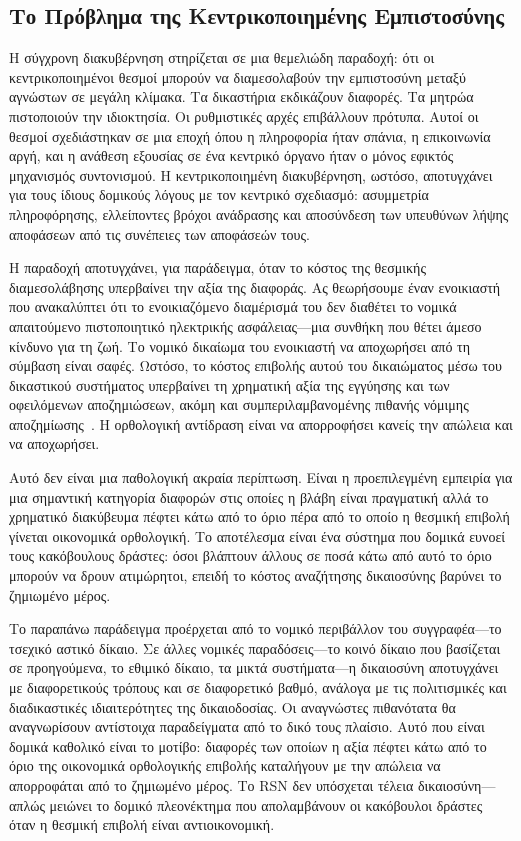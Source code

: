 \documentclass[11pt,a4paper,twocolumn]{article}
\begin{document}
\subsection{Το Πρόβλημα της Κεντρικοποιημένης Εμπιστοσύνης}

Η σύγχρονη διακυβέρνηση στηρίζεται σε μια θεμελιώδη παραδοχή: ότι οι κεντρικοποιημένοι θεσμοί μπορούν να διαμεσολαβούν την εμπιστοσύνη μεταξύ αγνώστων σε μεγάλη κλίμακα. Τα δικαστήρια εκδικάζουν διαφορές. Τα μητρώα πιστοποιούν την ιδιοκτησία. Οι ρυθμιστικές αρχές επιβάλλουν πρότυπα. Αυτοί οι θεσμοί σχεδιάστηκαν σε μια εποχή όπου η πληροφορία ήταν σπάνια, η επικοινωνία αργή, και η ανάθεση εξουσίας σε ένα κεντρικό όργανο ήταν ο μόνος εφικτός μηχανισμός συντονισμού. Η κεντρικοποιημένη διακυβέρνηση, ωστόσο, αποτυγχάνει για τους ίδιους δομικούς λόγους με τον κεντρικό σχεδιασμό: ασυμμετρία πληροφόρησης, ελλείποντες βρόχοι ανάδρασης και αποσύνδεση των υπευθύνων λήψης αποφάσεων από τις συνέπειες των αποφάσεών τους.

Η παραδοχή αποτυγχάνει, για παράδειγμα, όταν το κόστος της θεσμικής διαμεσολάβησης υπερβαίνει την αξία της διαφοράς. Ας θεωρήσουμε έναν ενοικιαστή που ανακαλύπτει ότι το ενοικιαζόμενο διαμέρισμά του δεν διαθέτει το νομικά απαιτούμενο πιστοποιητικό ηλεκτρικής ασφάλειας---μια συνθήκη που θέτει άμεσο κίνδυνο για τη ζωή. Το νομικό δικαίωμα του ενοικιαστή να αποχωρήσει από τη σύμβαση είναι σαφές. Ωστόσο, το κόστος επιβολής αυτού του δικαιώματος μέσω του δικαστικού συστήματος υπερβαίνει τη χρηματική αξία της εγγύησης και των οφειλόμενων αποζημιώσεων, ακόμη και συμπεριλαμβανομένης πιθανής νόμιμης αποζημίωσης~\cite{czcourtfees}. Η ορθολογική αντίδραση είναι να απορροφήσει κανείς την απώλεια και να αποχωρήσει.

Αυτό δεν είναι μια παθολογική ακραία περίπτωση. Είναι η προεπιλεγμένη εμπειρία για μια σημαντική κατηγορία διαφορών στις οποίες η βλάβη είναι πραγματική αλλά το χρηματικό διακύβευμα πέφτει κάτω από το όριο πέρα από το οποίο η θεσμική επιβολή γίνεται οικονομικά ορθολογική. Το αποτέλεσμα είναι ένα σύστημα που δομικά ευνοεί τους κακόβουλους δράστες: όσοι βλάπτουν άλλους σε ποσά κάτω από αυτό το όριο μπορούν να δρουν ατιμώρητοι, επειδή το κόστος αναζήτησης δικαιοσύνης βαρύνει το ζημιωμένο μέρος.

Το παραπάνω παράδειγμα προέρχεται από το νομικό περιβάλλον του συγγραφέα---το τσεχικό αστικό δίκαιο. Σε άλλες νομικές παραδόσεις---το κοινό δίκαιο που βασίζεται σε προηγούμενα, το εθιμικό δίκαιο, τα μικτά συστήματα---η δικαιοσύνη αποτυγχάνει με διαφορετικούς τρόπους και σε διαφορετικό βαθμό, ανάλογα με τις πολιτισμικές και διαδικαστικές ιδιαιτερότητες της δικαιοδοσίας. Οι αναγνώστες πιθανότατα θα αναγνωρίσουν αντίστοιχα παραδείγματα από το δικό τους πλαίσιο. Αυτό που είναι δομικά καθολικό είναι το μοτίβο: διαφορές των οποίων η αξία πέφτει κάτω από το όριο της οικονομικά ορθολογικής επιβολής καταλήγουν με την απώλεια να απορροφάται από το ζημιωμένο μέρος. Το RSN δεν υπόσχεται τέλεια δικαιοσύνη---απλώς μειώνει το δομικό πλεονέκτημα που απολαμβάνουν οι κακόβουλοι δράστες όταν η θεσμική επιβολή είναι αντιοικονομική.
\end{document}
